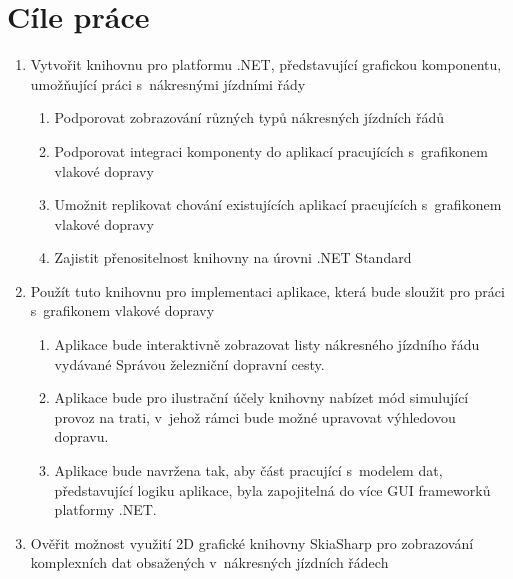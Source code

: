 \section{Cíle práce}
\label{kap1:cile_prace}
\begin{enumerate}[label=\color{goalcolor}\textbf{G{\arabic*}}]
	\item \label{uvod:cil:knihovna}Vytvořit knihovnu pro platformu .NET, představující grafickou komponentu, umožňující práci s~nákresnými jízdními řády
	\begin{enumerate}[label=\color{goalcolor}\textbf{\alph*})]
		\item \label{uvod:cil:knihovna:ruzne_typy_njr} Podporovat zobrazování různých typů nákresných jízdních řádů
		\item \label{uvod:cil:knihovna:integrace_do_aplikaci} Podporovat integraci komponenty do aplikací pracujících s~grafikonem vlakové dopravy
		\item \label{uvod:cil:knihovna:replikace_chovani} Umožnit replikovat chování existujících aplikací pracujících s~grafikonem vlakové dopravy
		\item \label{uvod:cil:knihovna:dotnet_standard} Zajistit přenositelnost knihovny na úrovni .NET Standard
	\end{enumerate}

	\item \label{uvod:cil:aplikace} Použít tuto knihovnu pro implementaci aplikace, která bude sloužit pro práci s~grafikonem vlakové dopravy
	\begin{enumerate}[label=\color{goalcolor}\textbf{\alph*})]
		\item \label{uvod:cil:aplikace:staticke_zobrazeni} Aplikace bude interaktivně zobrazovat listy nákresného jízdního řádu vydávané Správou železniční dopravní cesty.
		\item \label{uvod:cil:aplikace:dynamicke_zobrazeni} Aplikace bude pro ilustrační účely knihovny nabízet mód simulující provoz na trati, v~jehož rámci bude možné upravovat výhledovou dopravu.
		\item \label{uvod:cil:aplikace:vice_gui} Aplikace bude navržena tak, aby část pracující s~modelem dat, představující logiku aplikace, byla zapojitelná do více GUI frameworků platformy .NET.
	\end{enumerate}
	
	\item \label{uvod:cil:skia} Ověřit možnost využití 2D grafické knihovny SkiaSharp pro zobrazování komplexních dat obsažených v~nákresných jízdních řádech
\end{enumerate}
